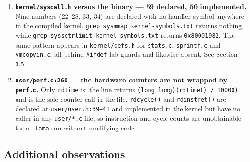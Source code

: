 \documentclass[11pt]{article}
\renewcommand{\_}{\origunderscore\allowbreak}
\begin{document}
\begin{enumerate}[leftmargin=1.4cm, itemsep=8pt]
\item \textbf{\texttt{kernel/syscall.h} versus the binary --- 59 declared, 50 implemented.} Nine numbers (22--28, 33, 34) are declared with no handler symbol anywhere in the compiled kernel. \texttt{grep sys\_mmap kernel-symbols.txt} returns nothing while \texttt{grep sys\_setrlimit kernel-symbols.txt} returns \texttt{0x80001982}. The same pattern appears in \texttt{kernel/\allowbreak{}defs.h} for \texttt{stats.c}, \texttt{sprintf.c} and \texttt{vmcopyin.c}, all behind \texttt{\#ifdef} lab guards and likewise absent. See Section 3.5.

\item \textbf{\texttt{user/\allowbreak{}perf.c:260} --- the hardware counters are not wrapped by \texttt{perf.c}.} Only \texttt{rdtime} is: the line returns \texttt{(long long)(rdtime() / 10000)} and is the sole counter call in the file. \texttt{rdcycle()} and \texttt{rdinstret()} are declared at \texttt{user/\allowbreak{}user.h:39--41} and implemented in the kernel but have no caller in any \texttt{user/*.c} file, so instruction and cycle counts are unobtainable for a \texttt{llama} run without modifying code.

\end{enumerate}

\subsection*{Additional observations}
\end{document}
